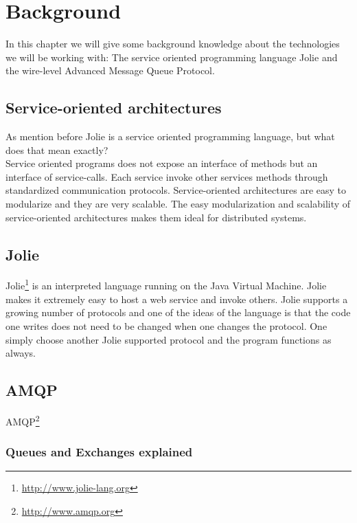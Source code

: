 \section{Background}
In this chapter we will give some background knowledge about the technologies we will be working with: The service oriented programming language Jolie and the wire-level Advanced Message Queue Protocol.
\subsection{Service-oriented architectures}
As mention before Jolie is a service oriented programming language, but what does that mean exactly?\\
Service oriented programs does not expose an interface of methods but an interface of service-calls. Each service invoke other services methods through standardized communication protocols. Service-oriented architectures are easy to modularize and they are very scalable. The easy modularization and scalability of service-oriented architectures makes them ideal for distributed systems.
\subsection{Jolie}
Jolie\footnote{\url{http://www.jolie-lang.org}} is an interpreted language running on the Java Virtual Machine. Jolie makes it extremely easy to host a web service and invoke others. Jolie supports a growing number of protocols and one of the ideas of the language is that the code one writes does not need to be changed when one changes the protocol. One simply choose another Jolie supported protocol and the program functions as always.
\subsection{AMQP}
AMQP\footnote{\url{http://www.amqp.org}}
\subsubsection{Queues and Exchanges explained}
\newpage